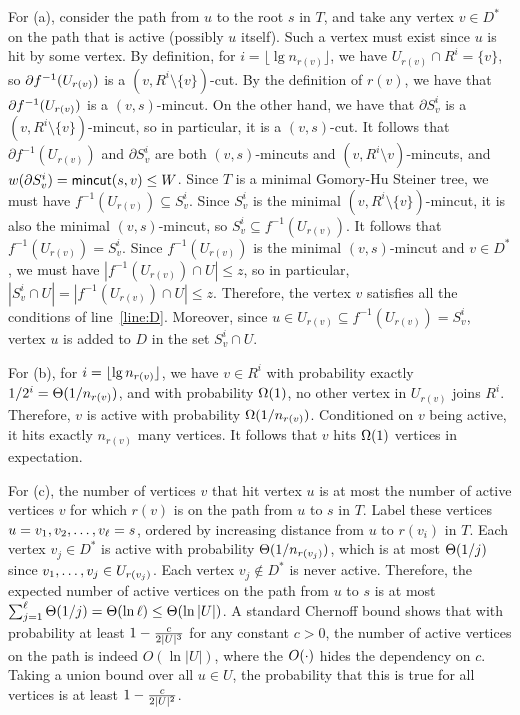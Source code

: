 For (a), consider the path from $u$ to the root $s$ in $T$, and take any vertex $v\in D^*$ on the path that is active (possibly $u$ itself). Such a vertex must exist since $u$ is hit by some vertex. By definition, for $i=\lfloor\lg n_{r(v)}\rfloor$, we have $U_{r(v)}\cap R^i=\{v\}$, so $\partial f^{-1}(U_{r(v)})$ is a $(v,R^i\setminus \{v\})$-cut.  By the definition of $r(v)$, we have that $\partial f^{-1}(U_{r(v)})$ is a $(v,s)$-mincut. On the other hand, we have that $\partial S^i_v$ is a $(v,R^i\setminus\{v\})$-mincut, so in particular, it is a $(v,s)$-cut. It follows that $\partial f^{-1}(U_{r(v)})$ and $\partial S^i_v$ are both $(v,s)$-mincuts and $(v,R^i\setminus v)$-mincuts, and $w(\partial S^i_v)=\textsf{\textup{mincut}}(s,v)\le W$. Since $T$ is a minimal Gomory-Hu Steiner tree, we must have $f^{-1}(U_{r(v)}) \subseteq S^i_v$. Since $S^i_v$ is the minimal $(v,R^i\setminus\{v\})$-mincut, it is also the minimal $(v,s)$-mincut, so $S^i_v\subseteq f^{-1}(U_{r(v)}) $. It follows that $f^{-1}(U_{r(v)})=S^i_v$. Since $f^{-1}(U_{r(v)})$ is the minimal $(v,s)$-mincut and $v\in D^*$, we must have $|f^{-1}(U_{r(v)})\cap U|\le z$, so in particular, $|S^i_v\cap U|=|f^{-1}(U_{r(v)})\cap U|\le z$. Therefore, the vertex $v$ satisfies all the conditions of line~\ref{line:D}. Moreover, since $u\in U_{r(v)}\subseteq f^{-1}(U_{r(v)})= S^i_v$, vertex $u$ is added to $D$ in the set $S^i_v\cap U$. 

For (b), for $i=\lfloor\lg n_{r(v)}\rfloor$, we have $v\in R^i$ with probability exactly $1/2^i = \Theta(1/n_{r(v)})$, and with probability $\Omega(1)$, no other vertex in $U_{r(v)}$ joins $R^i$. Therefore, $v$ is active with probability $\Omega(1/n_{r(v)})$. Conditioned on $v$ being active, it hits exactly $n_{r(v)}$ many vertices. It follows that $v$ hits $\Omega(1)$ vertices in expectation.

For (c), the number of vertices $v$ that hit vertex $u$ is at most the number of active vertices $v$ for which $r(v)$ is on the path from $u$ to $s$ in $T$. Label these vertices $u=v_1,v_2,\ldots,v_\ell=s$, ordered by increasing distance from $u$ to $r(v_i)$ in $T$. Each vertex $v_j\in D^*$ is active with probability $\Theta(1/n_{r(v_j)})$, which is at most $\Theta(1/j)$ since $v_1,\ldots,v_j \in U_{r(v_j)}$. Each vertex $v_j\notin D^*$ is never active. Therefore, the expected number of active vertices on the path from $u$ to $s$ is at most $\sum_{j=1}^\ell\Theta(1/j)=\Theta(\ln\ell)\le \Theta(\ln|U|)$. A standard Chernoff bound shows that with probability at least $1-\frac c{2|U|^3}$ for any constant $c>0$, the number of active vertices on the path is indeed $O(\ln|U|)$, where the $O(\cdot)$ hides the dependency on $c$. Taking a union bound over all $u\in U$, the probability that this is true for all vertices is at least $1-\frac c{2|U|^2}$.

